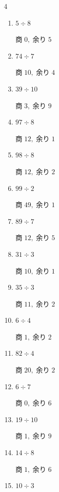 \begin{multicols}{4}
\begin{enumerate}
  \itemsep=3pt
  \item $5 \div 8$

        $商\; 0,\; 余り\; 5$

  \item $74 \div 7$

        $商\; 10,\; 余り\; 4$

  \item $39 \div 10$

        $商\; 3,\; 余り\; 9$

  \item $97 \div 8$

        $商\; 12,\; 余り\; 1$

  \item $98 \div 8$

        $商\; 12,\; 余り\; 2$

  \item $99 \div 2$

        $商\; 49,\; 余り\; 1$

  \item $89 \div 7$

        $商\; 12,\; 余り\; 5$

  \item $31 \div 3$

        $商\; 10,\; 余り\; 1$

  \item $35 \div 3$

        $商\; 11,\; 余り\; 2$

  \item $6 \div 4$

        $商\; 1,\; 余り\; 2$

  \item $82 \div 4$

        $商\; 20,\; 余り\; 2$

  \item $6 \div 7$

        $商\; 0,\; 余り\; 6$

  \item $19 \div 10$

        $商\; 1,\; 余り\; 9$

  \item $14 \div 8$

        $商\; 1,\; 余り\; 6$

  \item $10 \div 3$


\end{enumerate}
\end{multicols}

